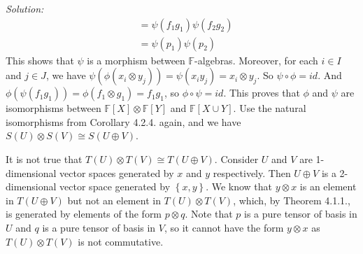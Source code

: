 \documentclass[a4paper, 12pt]{article}
\newenvironment{solution}
    {\textit{Solution:}}
    {}
\begin{document}
\begin{solution}
\begin{align*}
                 & =\psi(f_1g_1)\psi(f_2g_2)\\ 
				 & =\psi(p_1)\psi(p_2)
\end{align*}
This shows that \(\psi\) is a morphism between \(\mathbb{F}\)-algebras. Moreover, for each \(i\in I\) and \(j\in J\), we have \(\psi(\phi(x_i\otimes y_j))=\psi(x_iy_j)=x_i\otimes y_j\). So \(\psi\circ \phi=id\). 
And \(\phi(\psi(f_1g_1))=\phi(f_1\otimes g_1)=f_1g_1\), so \(\phi \circ \psi=id\). This proves that \(\phi\) and \(\psi\) are isomorphisms between \(\mathbb{F}[X]\otimes \mathbb{F}[Y]\) and \(\mathbb{F}[X\cup Y]\). Use the natural 
isomorphisms from Corollary 4.2.4. again, and we have \(S(U)\otimes S(V)\cong S(U\oplus V)\).
\par 
It is not true that \(T(U)\otimes T(V)\cong T(U\oplus V)\). Consider \(U\) and \(V\) are 1-dimensional vector spaces generated by \(x\) and \(y\) respectively. Then \(U\oplus V\) is a 2-dimensional vector space generated by \(\left\{ x,y \right\}\). We know 
that \(y\otimes x\) is an element in \(T(U\oplus V)\) but not an element in \(T(U)\otimes T(V)\), which, by Theorem 4.1.1., is generated by elements of the form \(p\otimes q\). Note that \(p\) is a pure tensor of basis in \(U\) and 
\(q\) is a pure tensor of basis in \(V\), so it cannot have the form \(y\otimes x\) as \(T(U)\otimes T(V)\) is not commutative. 
\end{solution}
\end{document}
